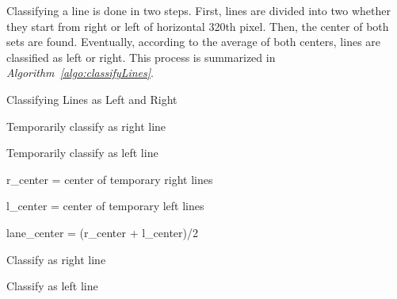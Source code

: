 \documentclass[a4paper,12pt]{article}
\begin{document}
\begin{enumerate}
Classifying a line is done in two steps. First, lines are divided into two whether they start from right or left of horizontal 320th pixel. Then, the center of both sets are found. Eventually, according to the average of both centers, lines are classified as left or right. This process is summarized in \textit{Algorithm~\ref{algo:classifyLines}}.



\begin{algorithm}[b!]

\caption{Classifying Lines as Left and Right}

\label{algo:classifyLines}

\DontPrintSemicolon




{ 


{

Temporarily classify as right line 

}

\Else

{

Temporarily classify as left line 

}

}


r\_center = center of temporary right lines \;

l\_center = center of temporary left lines \;


lane\_center = (r\_center + l\_center)/2 \;



{ 


{

Classify as right line 

}

\Else

{

Classify as left line 

}

}

\end{algorithm}

\begin{figure}[b!]

\setlength{\unitlength}{\textwidth} 

\centering


\end{figure}
\end{enumerate}
\end{document}
